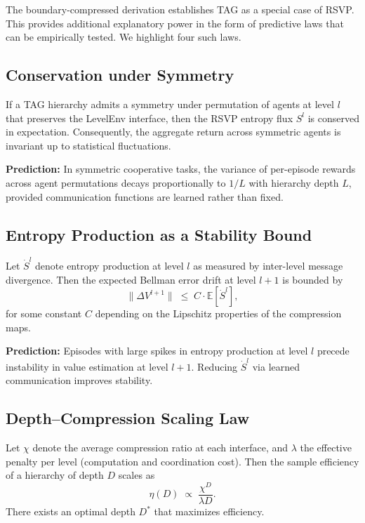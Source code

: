 \documentclass[11pt,a4paper]{article}
\begin{document}
The boundary-compressed derivation establishes TAG as a special case of RSVP.
This provides additional explanatory power in the form of predictive laws that
can be empirically tested. We highlight four such laws.

\subsection{Conservation under Symmetry}

\begin{proposition}
If a TAG hierarchy admits a symmetry under permutation of agents at level $l$
that preserves the LevelEnv interface, then the RSVP entropy flux $S^l$ is
conserved in expectation. Consequently, the aggregate return across symmetric
agents is invariant up to statistical fluctuations.
\end{proposition}

\noindent
\textbf{Prediction:} In symmetric cooperative tasks, the variance of
per-episode rewards across agent permutations decays proportionally to
$1/L$ with hierarchy depth $L$, provided communication functions are
learned rather than fixed.

\subsection{Entropy Production as a Stability Bound}

\begin{proposition}
Let $\dot S^l$ denote entropy production at level $l$ as measured by
inter-level message divergence. Then the expected Bellman error drift at level
$l{+}1$ is bounded by
\[
\|\Delta V^{l+1}\| \;\leq\; C \cdot \mathbb{E}[\dot S^l],
\]
for some constant $C$ depending on the Lipschitz properties of the compression
maps.
\end{proposition}

\noindent
\textbf{Prediction:} Episodes with large spikes in entropy production at level
$l$ precede instability in value estimation at level $l{+}1$. Reducing
$\dot S^l$ via learned communication improves stability.

\subsection{Depth--Compression Scaling Law}

\begin{proposition}
Let $\chi$ denote the average compression ratio at each interface, and
$\lambda$ the effective penalty per level (computation and coordination cost).
Then the sample efficiency of a hierarchy of depth $D$ scales as
\[
\eta(D) \;\propto\; \frac{\chi^D}{\lambda D}.
\]
There exists an optimal depth $D^\ast$ that maximizes efficiency.
\end{proposition}
\end{document}
